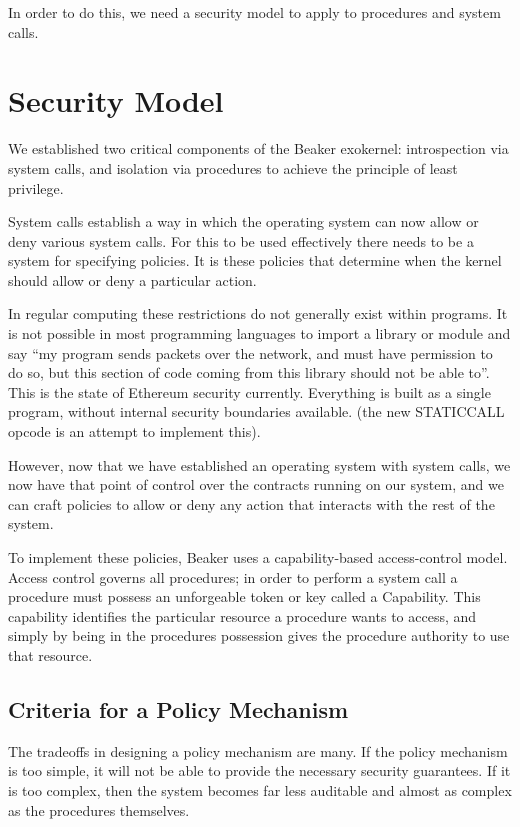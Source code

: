 \documentclass[english,a4paper]{article}
\begin{document}
In order to do this, we need a security model to apply to procedures and
system calls.

\section{Security Model}\label{security-model}

We established two critical components of the Beaker exokernel:
introspection via system calls, and isolation via procedures to achieve
the principle of least privilege.

System calls establish a way in which the operating system can now allow
or deny various system calls. For this to be used effectively there
needs to be a system for specifying policies. It is these policies that
determine when the kernel should allow or deny a particular action.

In regular computing these restrictions do not generally exist within
programs. It is not possible in most programming languages to import a
library or module and say ``my program sends packets over the network,
and must have permission to do so, but this section of code coming from
this library should not be able to''. This is the state of Ethereum
security currently. Everything is built as a single program, without
internal security boundaries available. (the new STATICCALL opcode is an
attempt to implement this).

However, now that we have established an operating system with system
calls, we now have that point of control over the contracts running on
our system, and we can craft policies to allow or deny any action that
interacts with the rest of the system.

To implement these policies, Beaker uses a capability-based
access-control model. Access control governs all procedures; in order to
perform a system call a procedure must possess an unforgeable token or
key called a Capability. This capability identifies the particular
resource a procedure wants to access, and simply by being in the
procedures possession gives the procedure authority to use that
resource.

\subsection{Criteria for a Policy
Mechanism}\label{criteria-for-a-policy-mechanism}

The tradeoffs in designing a policy mechanism are many. If the policy
mechanism is too simple, it will not be able to provide the necessary
security guarantees. If it is too complex, then the system becomes far
less auditable and almost as complex as the procedures themselves.
\end{document}
